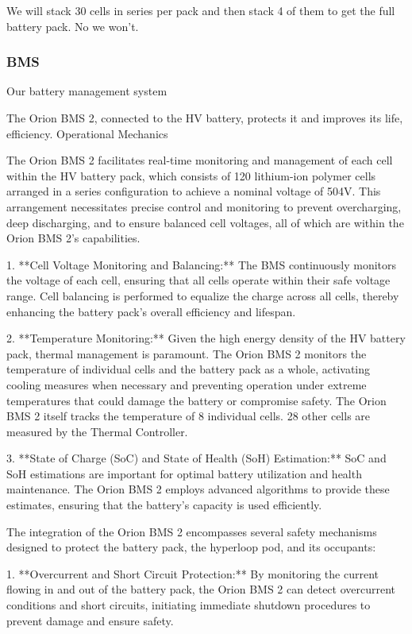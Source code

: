 We will stack 30 cells in series per pack and then stack 4 of them to get the full battery pack. No we won't.
\newline
\subsubsection{BMS}
Our battery management system 

The Orion BMS 2, connected to the HV battery, protects it and improves its life, efficiency. 
Operational Mechanics

The Orion BMS 2 facilitates real-time monitoring and management of each cell within the HV battery pack, 
which consists of 120 lithium-ion polymer cells arranged in a series configuration to achieve a nominal voltage of 504V. 
This arrangement necessitates precise control and monitoring to prevent overcharging, deep discharging, and to ensure balanced 
cell voltages, all of which are within the Orion BMS 2's capabilities.

1. **Cell Voltage Monitoring and Balancing:** The BMS continuously monitors the voltage of each cell, ensuring 
that all cells operate within their safe voltage range. Cell balancing is performed to equalize the charge across all cells,
thereby enhancing the battery pack's overall efficiency and lifespan.

2. **Temperature Monitoring:** 
Given the high energy density of the HV battery pack, 
thermal management is paramount. The Orion BMS 2 monitors the temperature of individual cells 
and the battery pack as a whole, activating cooling measures when necessary and preventing operation 
under extreme temperatures that could damage the battery or compromise safety.
The Orion BMS 2 itself tracks the temperature of 8 individual cells. 28 other cells are measured by the Thermal Controller.

3. **State of Charge (SoC) and State of Health (SoH) Estimation:** 
SoC and SoH estimations are important for optimal battery utilization and health maintenance. 
The Orion BMS 2 employs advanced algorithms to provide these estimates, 
ensuring that the battery's capacity is used efficiently.


The integration of the Orion BMS 2 encompasses several safety mechanisms designed to protect the battery pack, the hyperloop pod, and its occupants:

1. **Overcurrent and Short Circuit Protection:** By monitoring the current flowing in and out of the battery pack, the Orion BMS 2 can detect overcurrent conditions and short circuits, initiating immediate shutdown procedures to prevent damage and ensure safety.

